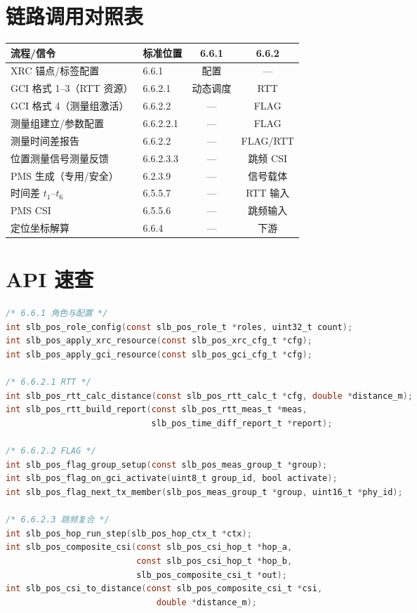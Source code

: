 \documentclass[11pt,a4paper]{ctexart}
\begin{document}
\section{链路调用对照表}

\begin{table}[h]
\centering
\small
\begin{tabular}{llcc}
\toprule
\textbf{流程/信令} & \textbf{标准位置} & \textbf{6.6.1} & \textbf{6.6.2} \\
\midrule
XRC 锚点/标签配置 & 6.6.1 & 配置 & --- \\
GCI 格式 1--3（RTT 资源） & 6.6.2.1 & 动态调度 & RTT \\
GCI 格式 4（测量组激活） & 6.6.2.2 & --- & FLAG \\
测量组建立/参数配置 & 6.6.2.2.1 & --- & FLAG \\
测量时间差报告 & 6.6.2.2 & --- & FLAG/RTT \\
位置测量信号测量反馈 & 6.6.2.3.3 & --- & 跳频 CSI \\
PMS 生成（专用/安全） & 6.2.3.9 & --- & 信号载体 \\
时间差 $t_1$--$t_6$ & 6.5.5.7 & --- & RTT 输入 \\
PMS CSI & 6.5.5.6 & --- & 跳频输入 \\
定位坐标解算 & 6.6.4 & --- & 下游 \\
\bottomrule
\end{tabular}
\end{table}

\section{API 速查}

\begin{lstlisting}[language=C]
/* 6.6.1 角色与配置 */
int slb_pos_role_config(const slb_pos_role_t *roles, uint32_t count);
int slb_pos_apply_xrc_resource(const slb_pos_xrc_cfg_t *cfg);
int slb_pos_apply_gci_resource(const slb_pos_gci_cfg_t *cfg);

/* 6.6.2.1 RTT */
int slb_pos_rtt_calc_distance(const slb_pos_rtt_calc_t *cfg, double *distance_m);
int slb_pos_rtt_build_report(const slb_pos_rtt_meas_t *meas,
                             slb_pos_time_diff_report_t *report);

/* 6.6.2.2 FLAG */
int slb_pos_flag_group_setup(const slb_pos_meas_group_t *group);
int slb_pos_flag_on_gci_activate(uint8_t group_id, bool activate);
int slb_pos_flag_next_tx_member(slb_pos_meas_group_t *group, uint16_t *phy_id);

/* 6.6.2.3 跳频复合 */
int slb_pos_hop_run_step(slb_pos_hop_ctx_t *ctx);
int slb_pos_composite_csi(const slb_pos_csi_hop_t *hop_a,
                          const slb_pos_csi_hop_t *hop_b,
                          slb_pos_composite_csi_t *out);
int slb_pos_csi_to_distance(const slb_pos_composite_csi_t *csi,
                              double *distance_m);
\end{lstlisting}
\end{document}
